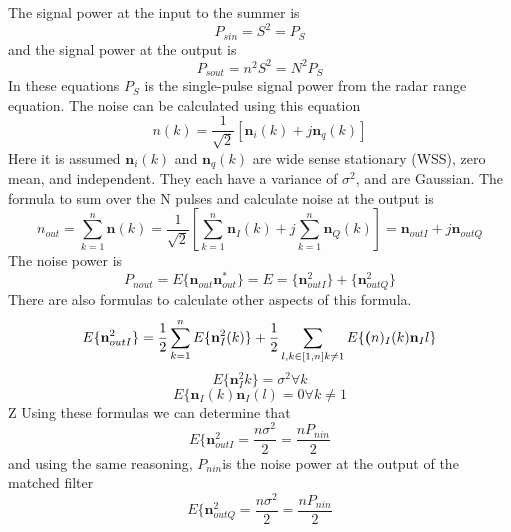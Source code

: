 \documentclass[12pt]{article}
\begin{document}
The signal power at the input to the summer is 
\begin{equation}
    P_{sin} = S^2 = P_S
\end{equation}
and the signal power at the output is 
\begin{equation}
    P_{sout} = n^2S^2 = N^2 P_S
\end{equation}
In these equations $P_S$ is the single-pulse signal power from the radar range equation. The noise can be calculated using this equation
\begin{equation}
    n(k) = \frac{1}{\sqrt{2}} [ \textbf{n}_i (k) + j \textbf{n}_q (k) ]
\end{equation}
Here it is assumed $\textbf{n}_i(k)$ and $\textbf{n}_q(k)$ are wide sense stationary (WSS), zero mean, and independent. They each have a variance of $\sigma^2$, and are Gaussian. The formula to sum over the N pulses and calculate noise at the output is 
\begin{equation}
    n_{out} = \sum_{k=1}^{n} \textbf{n}(k)= \frac{1}{\sqrt{2}} \left[ \sum_{k=1}^{n} \textbf{n}_I(k) + j 
    \sum_{k=1}^{n} \textbf{n}_Q (k)\right] = \textbf{n}_{outI} + j \textbf{n}_{outQ}
\end{equation}
The noise power is 
\begin{equation}
    P_{nout} = E \{ \textbf{n}_{out}  \textbf{n}_{out}^* \} = E = \{ \textbf{n}^2_{outI} \} + \{ \textbf{n}^2_{outQ} \}
\end{equation}
There are also formulas to calculate other aspects of this formula.
\begin{equation}
    E \{ \textbf{n}^2_{outI} \} = \frac{1}{2} \sum_{k=1}^{n} E\{ \textbf{n}^2_I (k)\} + \frac{1}{2} \sum_{l, k \in [1,n] k \neq 1} E \{ \textbf(n)_I (k) \textbf{n}_I {l} \}
\end{equation}
\begin{equation}
    E \{ \textbf{n}^2_{I} {k}\} = \sigma^2 \forall k 
\end{equation}
\begin{equation}
    E \{ \textbf{n}_{I} (k) \textbf{n}_I (l) = 0 \forall k \neq 1
\end{equation}Z
Using these formulas we can determine that 
\begin{equation}
    E \{ \textbf{n}^2_{outI} = \frac{n \sigma^2}{2} = \frac{n P_{nin}}{2} 
\end{equation}
and using the same reasoning, $P_{nin}$is the noise power at the output of the matched filter
\begin{equation}
    E \{ \textbf{n}^2_{outQ} = \frac{n \sigma^2}{2} = \frac{n P_{nin}}{2} 
\end{equation}
\end{document}
